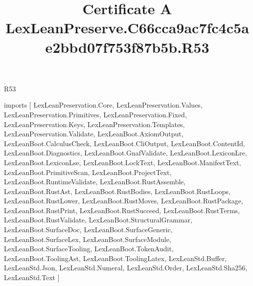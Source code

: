 \begin{lexlean}{R53}
\title{Certificate A LexLeanPreserve.C66cca9ac7fc4c5ae2bbd07f753f87b5b.R53}
\begin{coremodule}
imports [
  LexLeanPreservation.Core,
  LexLeanPreservation.Values,
  LexLeanPreservation.Primitives,
  LexLeanPreservation.Fixed,
  LexLeanPreservation.Keys,
  LexLeanPreservation.Templates,
  LexLeanPreservation.Validate,
  LexLeanBoot.AxiomOutput,
  LexLeanBoot.CalculusCheck,
  LexLeanBoot.CliOutput,
  LexLeanBoot.ContentId,
  LexLeanBoot.Diagnostics,
  LexLeanBoot.GnafValidate,
  LexLeanBoot.LexiconLre,
  LexLeanBoot.LexiconLse,
  LexLeanBoot.LockText,
  LexLeanBoot.ManifestText,
  LexLeanBoot.PrimitiveScan,
  LexLeanBoot.ProjectText,
  LexLeanBoot.RuntimeValidate,
  LexLeanBoot.RustAssemble,
  LexLeanBoot.RustAst,
  LexLeanBoot.RustBodies,
  LexLeanBoot.RustLoops,
  LexLeanBoot.RustLower,
  LexLeanBoot.RustMoves,
  LexLeanBoot.RustPackage,
  LexLeanBoot.RustPrint,
  LexLeanBoot.RustSucceed,
  LexLeanBoot.RustTerms,
  LexLeanBoot.RustValidate,
  LexLeanBoot.StructuralGrammar,
  LexLeanBoot.SurfaceDoc,
  LexLeanBoot.SurfaceGeneric,
  LexLeanBoot.SurfaceLex,
  LexLeanBoot.SurfaceModule,
  LexLeanBoot.SurfaceTooling,
  LexLeanBoot.TokenAudit,
  LexLeanBoot.ToolingAst,
  LexLeanBoot.ToolingLatex,
  LexLeanStd.Buffer,
  LexLeanStd.Json,
  LexLeanStd.Numeral,
  LexLeanStd.Order,
  LexLeanStd.Sha256,
  LexLeanStd.Text
]


\end{coremodule}
\end{lexlean}
